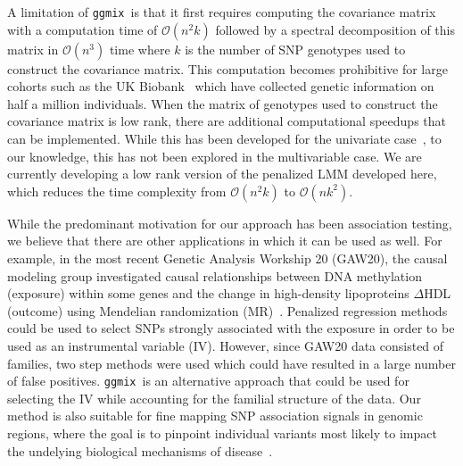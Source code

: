 \documentclass[12pt,letter]{article}\usepackage[]{graphicx}\usepackage[]{color}
\newcommand{\ggmix}{\texttt{ggmix}}
\begin{document}
A limitation of \ggmix ~is that it first requires computing the covariance matrix with a computation time of $\mathcal{O}(n^2k)$ followed by a spectral decomposition of this matrix in $\mathcal{O}(n^3)$ time where $k$ is the number of SNP genotypes used to construct the covariance matrix. This computation becomes prohibitive for large cohorts such as the UK Biobank~\citep{allen2012uk} which have collected genetic information on half a million individuals. When the matrix of genotypes used to construct the covariance matrix is low rank, there are additional computational speedups that can be implemented. While this has been developed for the univariate case~\citep{lippert2011fast}, to our knowledge, this has not been explored in the multivariable case. We are currently developing a low rank version of the penalized LMM developed here, which reduces the time complexity from $\mathcal{O}(n^2k)$ to $\mathcal{O}(nk^2)$.




While the predominant motivation for our approach has been association testing, we believe that there are other applications in which it can be used as well.
For example, in the most recent Genetic Analysis Workship 20 (GAW20),  the causal modeling group investigated causal
relationships between DNA methylation (exposure) within some genes
and the change in high-density lipoproteins $\Delta$HDL (outcome) using Mendelian randomization (MR)~\citep{davey2003mendelian}.
Penalized regression methods could be used to select SNPs strongly associated with the exposure in order to be used as an instrumental variable (IV).
However, since GAW20 data consisted of families, two step methods were used which could have resulted in a large number of false positives. \ggmix~is an alternative approach that could be used for selecting the IV while accounting for the familial structure of the data.
Our method is also suitable for fine mapping SNP association signals in genomic regions, where the goal is to pinpoint individual variants most likely to impact the undelying biological mechanisms of disease~\citep{spain2015strategies}.
\end{document}
